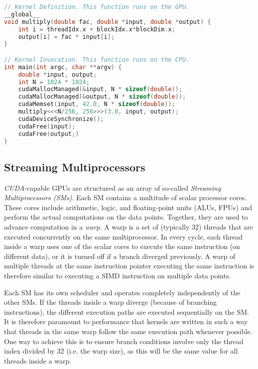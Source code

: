 \begin{lstfloat}
\begin{lstlisting}[caption={Example showing kernel, its launch and CUDA API calls for allocating unified memory},captionpos=b,language=C]
// Kernel Definition. This function runs on the GPU.
__global__
void multiply(double fac, double *input, double *output) {
    int i = threadIdx.x + blockIdx.x*blockDim.x;
    output[i] = fac * input[i];
}

// Kernel Invocation. This function runs on the CPU.
int main(int argc, char **argv) {
    double *input, output;
    int N = 1024 * 1024;
    cudaMallocManaged(&input, N * sizeof(double));
    cudaMallocManaged(&output, N * sizeof(double));
    cudaMemset(input, 42.0, N * sizeof(double));
    multiply<<<N/256, 256>>>(3.0, input, output);
    cudaDeviceSynchronize();
    cudaFree(input);
    cudaFree(output;)
}
\end{lstlisting}
\end{lstfloat}

\subsection{Streaming Multiprocessors} \label{sec:hardware}

\emph{CUDA}-capable GPUs are structured as an array of so-called \emph{Streaming Multiprocessors (SMs)}. Each SM contains a multitude of scalar processor cores. These cores include arithmetic, logic, and floating-point units (ALUs, FPUs) and perform the actual computations on the data points. Together, they are used to advance computation in a \emph{warp}. A warp is a set of (typically 32) threads that are executed concurrently on the same multiprocessor. In every cycle, each thread inside a warp uses one of the scalar cores to execute the same instruction (on different data), or it is turned off if a branch diverged previously. A warp of multiple threads at the same instruction pointer executing the same instruction is therefore similar to executing a SIMD instruction on multiple data points.

Each SM has its own scheduler and operates completely independently of the other SMs. If the threads inside a warp diverge (because of branching instructions), the different execution paths are executed sequentially on the SM. It is therefore paramount to performance that kernels are written in such a way that threads in the same warp follow the same execution path whenever possible. One way to achieve this is to ensure branch conditions involve only the thread index divided by 32 (i.e. the warp size), as this will be the same value for all threads inside a warp. 

